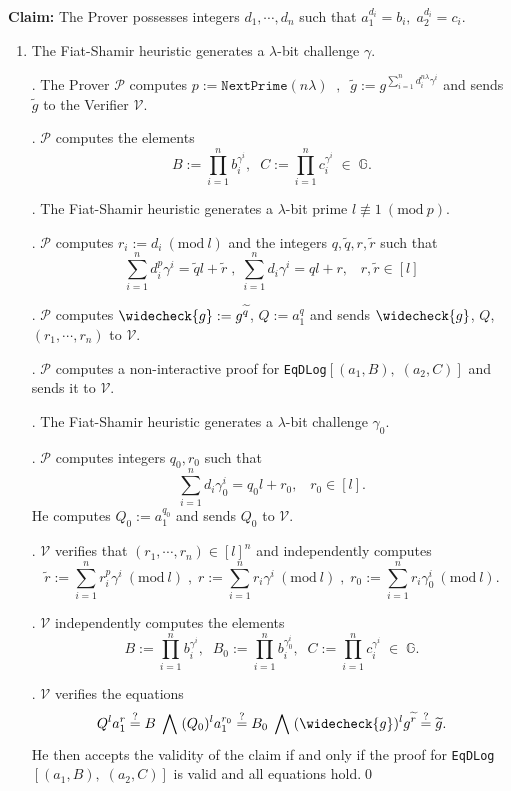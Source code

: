 \documentclass[11pt, lettersize, notitlepage, leqno, footskip=0.6cm]{article}
\newcommand{\slim}{\sum\limits}
\newcommand{\ttt}{\texttt}
\newcommand{\wti}{\widetilde}
\newcommand{\mc}{\mathcal}
\newcommand{\mb}{\mathbb}
\newcommand{\lam}{\lambda}
\newcommand{\weck}{\widecheck}
\newcommand{\mP}{\mc{P}}
\newcommand{\V}{\mc{V}}
\newcommand{\vs}{\vspace{-0.15cm}}
\newcommand{\noin}{\noindent}
\newcommand{\sta}{\stackrel{?}{=}}
\newcommand{\Mod}[1]{\ (\mathrm{mod}\ #1)}
\numberwithin{equation}{section}
\begin{document}
{%

\noindent \textbf{Claim:} The Prover possesses integers $d_1,\cdots, d_n$ such that $a_1^{d_i} = b_i,\; a_2^{d_i} = c_i$.

\begin{enumerate}[wide, labelwidth=!, labelindent=0pt]\vs \item The Fiat-Shamir heuristic generates a $\lam$-bit challenge $\gamma$.

\noin 2. The Prover $\mP$ computes $p:= \ttt{NextPrime}(n\lam)\;\;,\;\;\wti{g} := g^{\slim_{i=1}^n d_i^{n\lam}\gamma^i}$ and sends $\wti{g}$ to the Verifier $\V$.
 
\noin 3. $\mc{P}$ computes the elements \vs $$B:= \prod\limits_{i=1}^n b_i^{\gamma^i},\;\;C:= \prod\limits_{i=1}^n c_i^{\gamma^i}\;\in\; \mb{G}.$$

\noin 4. The Fiat-Shamir heuristic generates a $\lam$-bit prime $l\not\equiv 1\Mod{p}$.

\noin 5. $\mP$ computes $r_i:= d_i\Mod{l}$ and the integers $q,\wti{q}, r,\wti{r}$ such that \vs $$\slim_{i=1}^n d_i^{p}\gamma^i = \wti{q}l+\wti{r}\;,\;\slim_{i=1}^n d_i\gamma^i = ql+r,\;\;\;r,\wti{r}\in[l]$$

\noin 6. $\mP$ computes $\weck{g}:= g^{\wti{q}}$, $Q:= a_1^q$ and sends $\weck{g}$, $Q$, $(r_1,\cdots,r_n)$ to $\V$.   
 
. $\mc{P}$ computes a non-interactive proof for \verb|EqDLog|$[(a_1, B),\; (a_2, C)]$ and sends it to $\mc{V}$.

\noin 8. The Fiat-Shamir heuristic generates a $\lam$-bit challenge $\gamma_0$.

\noin 9. $\mP$ computes integers $q_0,r_0$ such that \vs $$\slim_{i=1}^n d_i\gamma_0^i = q_0l+r_0,\;\;\;r_0\in[l] .$$ He computes $Q_0:= a_1^{q_0}$ and sends $Q_0$ to $\V$.

. $\V$ verifies that $(r_1,\cdots,r_n)\in [l]^n$ and independently computes \vs $$\wti{r}:= \slim_{i=1}^n r_i^{p}\gamma^i \Mod{l}\;,\;r:= \slim_{i=1}^n r_i\gamma^i \Mod{l}\;,\;r_0:= \slim_{i=1}^n r_i\gamma_0^i \Mod{l} .$$

\noin 11. $\V$ independently computes the elements \vs $$B:= \prod\limits_{i=1}^n b_i^{\gamma^i},\;\;B_0:= \prod\limits_{i=1}^n b_i^{\gamma_0^i},\;\;   C:= \prod\limits_{i=1}^n c_i^{\gamma^i}\;\in\; \mb{G}.$$

\noin 12. $\V$ verifies the equations \vs $$Q^la_1^{r}\sta B\;\bigwedge\;(Q_0)^la_1^{r_0}\sta B_0\;\bigwedge\; (\weck{g})^lg^{\wti{r}}\sta \wti{g} .$$ He then accepts the validity of the claim if and only if the proof for \verb|EqDLog|$[(a_1, B),\; (a_2, C)]$ is valid and all equations hold.\qed\end{enumerate}


}
\end{document}
